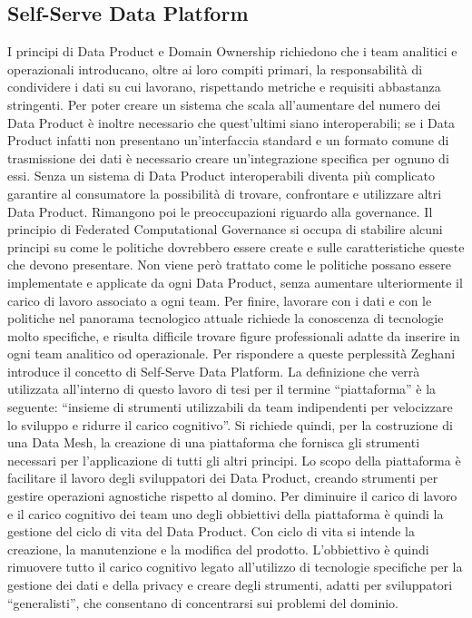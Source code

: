 \documentclass[12pt]{report}
\begin{document}
\subsection{Self-Serve Data Platform}\label{self-serve data platform}
I principi di Data Product e Domain Ownership richiedono che i team analitici e operazionali introducano, oltre ai loro compiti primari, la responsabilità di condividere i dati su cui lavorano, rispettando metriche e requisiti abbastanza stringenti.
Per poter creare un sistema che scala all'aumentare del numero dei Data Product è inoltre necessario che quest'ultimi siano interoperabili; se i Data Product infatti non presentano un'interfaccia standard e un formato comune di trasmissione dei dati è necessario creare un'integrazione specifica per ognuno di essi. 
Senza un sistema di Data Product interoperabili diventa più complicato garantire al consumatore la possibilità di trovare, confrontare e utilizzare altri Data Product.
Rimangono poi le preoccupazioni riguardo alla governance.
Il principio di Federated Computational Governance si occupa di stabilire alcuni principi su come le politiche dovrebbero essere create e sulle caratteristiche queste che devono presentare.
Non viene però trattato come le politiche possano essere implementate e applicate da ogni Data Product, senza aumentare ulteriormente il carico di lavoro associato a ogni team.
Per finire, lavorare con i dati e con le politiche nel panorama tecnologico attuale richiede la conoscenza di tecnologie molto specifiche, e risulta difficile trovare figure professionali adatte da inserire in ogni team analitico od operazionale.
Per rispondere a queste perplessità Zeghani introduce il concetto di Self-Serve Data Platform.
La definizione che verrà utilizzata all'interno di questo lavoro di tesi per il termine ``piattaforma'' è la seguente: ``insieme di strumenti utilizzabili da team indipendenti per velocizzare lo sviluppo e ridurre il carico cognitivo''.
Si richiede quindi, per la costruzione di una Data Mesh, la creazione di una piattaforma che fornisca gli strumenti necessari per l'applicazione di tutti gli altri principi.
Lo scopo della piattaforma è facilitare il lavoro degli sviluppatori dei Data Product, creando strumenti per gestire operazioni agnostiche rispetto al domino.
Per diminuire il carico di lavoro e il carico cognitivo dei team uno degli obbiettivi della piattaforma è quindi la gestione del ciclo di vita del Data Product.
Con ciclo di vita si intende la creazione, la manutenzione e la modifica del prodotto.
L'obbiettivo è quindi rimuovere tutto il carico cognitivo legato all'utilizzo di tecnologie specifiche per la gestione dei dati e della privacy e creare degli strumenti, adatti per sviluppatori ``generalisti'', che consentano di concentrarsi sui problemi del dominio.
\end{document}
